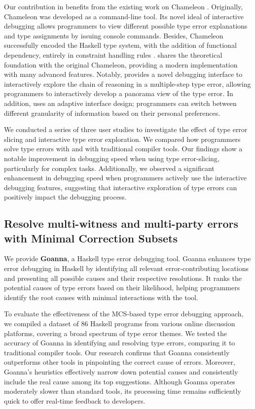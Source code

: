 Our contribution in \chameleon{} benefits from the existing work on Chameleon \cite{Stuckey2003-pz, Wazny2006-ll}. Originally,  Chameleon was developed as a command-line tool. Its novel ideal of interactive debugging allows programmers to view different possible type error explanations and type assignments by issuing console commands. Besides, Chameleon successfully encoded the Haskell type system, with the addition of functional dependency, entirely in constraint handling rules \cite{Fruhwirth1998-jq}. \chameleon{} shares the theoretical foundation with the original Chameleon, providing a modern implementation with many advanced features. Notably, \chameleon{} provides a novel debugging interface to interactively explore the chain of reasoning in a multiple-step type error, allowing programmers to interactively develop a panorama view of the type error. In addition, \chameleon{} uses an adaptive interface design; programmers can switch between different granularity of information based on their personal preferences. 


We conducted a series of three user studies to investigate the effect of type error slicing and interactive type error exploration. We compared how programmers solve type errors with \chameleon{} and with traditional compiler tools. Our findings show a notable improvement in debugging speed when using type error-slicing, particularly for complex tasks. Additionally, we observed a significant enhancement in debugging speed when programmers actively use the interactive debugging features, suggesting that interactive exploration of type errors can positively impact the debugging process.

\subsection{Resolve multi-witness and multi-party errors with Minimal Correction Subsets}

We provide \textbf{Goanna}, a Haskell type error debugging tool. Goanna enhances type error debugging in Haskell by identifying all relevant error-contributing locations and presenting all possible causes and their respective resolutions. It ranks the potential causes of type errors based on their likelihood, helping programmers identify the root causes with minimal interactions with the tool.


To evaluate the effectiveness of the MCS-based type error debugging approach, we compiled a dataset of 86 Haskell programs from various online discussion platforms, covering a broad spectrum of type error themes. We tested the accuracy of Goanna in identifying and resolving type errors, comparing it to traditional compiler tools. Our research confirms that Goanna consistently outperforms other tools in pinpointing the correct cause of errors. Moreover, Goanna's heuristics effectively narrow down potential causes and consistently include the real cause among its top suggestions. Although Goanna operates moderately slower than standard tools, its processing time remains sufficiently quick to offer real-time feedback to developers. 

